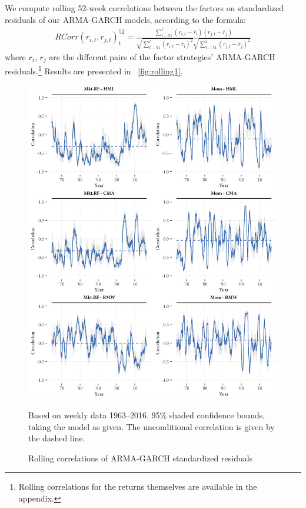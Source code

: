 We compute rolling 52-week correlations between the factors on standardized residuals of our ARMA-GARCH models, according to the formula: 
\begin{align}
    RCorr(r_{i, t}, r_{j, t})_t^{52} = \frac{\sum^{t}_{t-51}(r_{i, t} - \bar{r}_i)(r_{j,t} - \bar{r}_j)}{\sqrt{\sum^{t}_{t-51} (r_{i,t} - \bar{r}_i)^2} \sqrt{\sum^{t}_{t-51} (r_{j,t} - \bar{r}_j)^2}}
\end{align}
where $r_i$, $r_j$ are the different pairs of the factor strategies' ARMA-GARCH residuals.\footnote{Rolling correlations for the returns themselves are available in the appendix.} Results are presented in ~\autoref{fig:rolling1}.
\begin{figure}[!ht]
  \centering
  \includegraphics[scale=1]{graphics/rolling1.png}
  \footnotesize
  \caption{Rolling correlations of ARMA-GARCH standardized residuals}
  \begin{longcaption}
    Based on weekly data 1963--2016. 95\% shaded confidence bounds, taking the model as given. The unconditional correlation is given by the dashed line.
  \end{longcaption}
  \label{fig:rolling1}
\end{figure}
